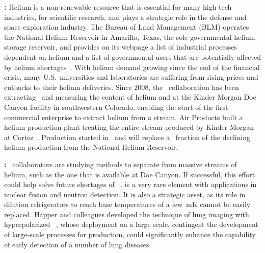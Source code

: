 \begin{asparaenum}
\item[\bf \ce{^4He}:] Helium is a non-renewable resource that is essential for many high-tech industries, for scientific research, and plays a strategic role in the defense and space exploration industry. The Bureau of Land Management (BLM) operates the National Helium Reservoir in Amarillo, 
Texas, the sole governmental helium storage reservoir, and provides on its webpage a list of industrial processes dependent on helium and a list of governmental users that are potentially affected by helium shortages~\cite{USDepartmentofInteriorBureauofLandManagement:2015ui}.  With helium demand growing since the end of the financial crisis, many U.S. universities and laboratories are suffering from rising prices and cutbacks to their helium deliveries.  Since 2008, the \DS\ collaboration has been extracting \UAr\ and measuring the content of helium and  at the Kinder Morgan Doe Canyon  facility in southwestern Colorado, enabling the start of the first commercial enterprise to extract helium from a  stream.  Air Products built a helium production plant treating the entire  stream produced by Kinder Morgan at Cortez~\cite{AirProductsandChemicalsInc:2015tv}.  Production started in \UraniaHeStartDate\ and will replace a \UraniaHeNationalReserveFractionEquivalentRate\ fraction of the declining helium production from the National Helium Reservoir.

\item[\bf \ce{^3He}:] \DS\ collaborators are studying methods to separate  from massive streams of helium, such as the one that is available at Doe Canyon.  If successful, this effort could help solve future shortages of ~\cite{Shea:2010vz}.   is a very rare element with applications in nuclear fusion and neutron detection. It is also a strategic asset, as its role in dilution refrigerators to reach base temperatures of a few~\si{\milli\kelvin} cannot be easily replaced.  Happer and colleagues developed the technique of lung imaging with hyperpolarized ~\cite{Happer:1984il}, whose deployment on a large scale, contingent the development of large-scale processes for  production, could significantly enhance the capability of early detection of a number of lung diseases.


\end{asparaenum}
